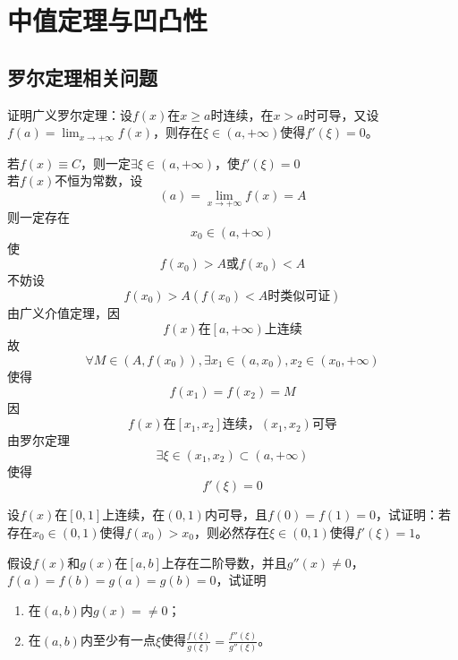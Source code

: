 \chapter{中值定理与凹凸性}
\section{罗尔定理相关问题}
\begin{example}
	\color{red}证明广义罗尔定理：设$f(x)$在$x\geqslant a$时连续，在$x>a$时可导，又设$f(a)=\lim_{x\to+\infty}f(x)$，则存在$\xi\in(a,+\infty)$使得$f'(\xi)=0$\color{black}。
\end{example}

	\begin{newproof}
			若$f\left( x \right) \equiv C$，则一定$\exists \xi \in \left( a,+\infty \right) $，使$f'\left( \xi \right) =0$\\
		若$f(x)$不恒为常数，设\[\left( a \right) =\underset{x\rightarrow +\infty}{\lim}f\left( x \right) =A\]
		则一定存在\[x_0\in \left( a,+\infty \right) \]
		使\[f\left( x_0 \right) >A\text{或}f\left( x_0 \right) <A\]
		不妨设\[ f\left( x_0 \right) >A\left( f\left( x_0 \right) <A\text{时类似可证} \right)  \]
		由广义介值定理，因\[ f\left( x \right) \text{在}\left[ a,\left. +\infty \right) \right. \text{上连续} \]
		故\[ \forall M\in \left( A,f\left( x_0 \right) \right) ,\exists x_1\in \left( a,x_0 \right) ,x_2\in \left( x_0,+\infty \right)  \]
		使得\[ f\left( x_1 \right) =f\left( x_2 \right) =M\]
		因\[ f\left( x \right) \text{在}\left[ x_1,x_2 \right] \text{连续，}\left( x_1,x_2 \right) \text{可导} \]
		由罗尔定理\[ \exists \xi \in \left( x_1,x_2 \right) \subset \left( a,+\infty \right)  \]
		使得\[ f'\left( \xi \right) =0 \]
		
	\end{newproof}

\begin{example}
	设$f(x)$在$[0,1]$上连续，在$(0,1)$内可导，且$f(0)=f(1)=0$，试证明：若存在$x_0\in(0,1)$使得$f(x_0)>x_0$，则必然存在$\xi\in(0,1)$使得$f'(\xi)=1$。
\end{example}
	\begin{newproof}
		
	\end{newproof}

\begin{example}
	假设$f(x)$和$g(x)$在$[a,b]$上存在二阶导数，并且$g''(x)\neq 0$，$f(a)=f(b)=g(a)=g(b)=0$，试证明
	\begin{enumerate}
		\item 在$(a,b)$内$g(x)=\neq 0$；
		\item 在$(a,b)$内至少有一点$\xi$使得$\frac{f(\xi)}{g(\xi)}=\frac{f''(\xi)}{g''(\xi)}$。
	\end{enumerate}
\end{example}

